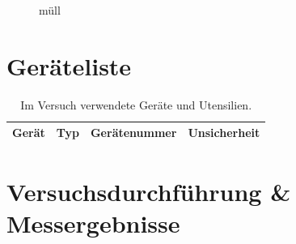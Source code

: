 \documentclass[12pt,a4paper,twoside]{article}
\begin{document}
    \begin{figure}[H]
        \centering
        \caption{müll}
        \label{fig:müllbild}
    \end{figure}

\section{Geräteliste} %

    \begin{table}[H]
        \centering
        \caption{Im Versuch verwendete Geräte und Utensilien.}
        \label{tab:geraete}
        \begin{tabular}{| l | l | l | l |}
            \hline
            Gerät   & Typ   & Gerätenummer  & Unsicherheit \\
            \hline
        \end{tabular}
    \end{table}


\section{Versuchsdurchführung \& Messergebnisse} %
\end{document}
